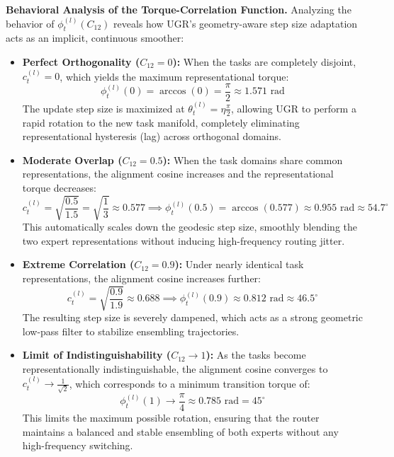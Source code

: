 \documentclass{article}
\theoremstyle{plain}
\theoremstyle{definition}
\theoremstyle{remark}
\begin{document}
\textbf{Behavioral Analysis of the Torque-Correlation Function.}
Analyzing the behavior of $\phi_t^{(l)}\left(C_{12}\right)$ reveals how UGR's geometry-aware step size adaptation acts as an implicit, continuous smoother:
\begin{itemize}
    \item \textbf{Perfect Orthogonality ($C_{12} = 0$):} 
    When the tasks are completely disjoint, $c_t^{(l)} = 0$, which yields the maximum representational torque:
    \begin{equation}
    \phi_t^{(l)}(0) = \arccos(0) = \frac{\pi}{2} \approx 1.571 \text{ rad}
    \end{equation}
    The update step size is maximized at $\theta_t^{(l)} = \eta \frac{\pi}{2}$, allowing UGR to perform a rapid rotation to the new task manifold, completely eliminating representational hysteresis (lag) across orthogonal domains.
    \item \textbf{Moderate Overlap ($C_{12} = 0.5$):}
    When the task domains share common representations, the alignment cosine increases and the representational torque decreases:
    \begin{equation}
    c_t^{(l)} = \sqrt{\frac{0.5}{1.5}} = \sqrt{\frac{1}{3}} \approx 0.577 \implies \phi_t^{(l)}(0.5) = \arccos\left(0.577\right) \approx 0.955 \text{ rad} \approx 54.7^\circ
    \end{equation}
    This automatically scales down the geodesic step size, smoothly blending the two expert representations without inducing high-frequency routing jitter.
    \item \textbf{Extreme Correlation ($C_{12} = 0.9$):}
    Under nearly identical task representations, the alignment cosine increases further:
    \begin{equation}
    c_t^{(l)} = \sqrt{\frac{0.9}{1.9}} \approx 0.688 \implies \phi_t^{(l)}(0.9) \approx 0.812 \text{ rad} \approx 46.5^\circ
    \end{equation}
    The resulting step size is severely dampened, which acts as a strong geometric low-pass filter to stabilize ensembling trajectories.
    \item \textbf{Limit of Indistinguishability ($C_{12} \to 1$):}
    As the tasks become representationally indistinguishable, the alignment cosine converges to $c_t^{(l)} \to \frac{1}{\sqrt{2}}$, which corresponds to a minimum transition torque of:
    \begin{equation}
    \phi_t^{(l)}(1) \to \frac{\pi}{4} \approx 0.785 \text{ rad} = 45^\circ
    \end{equation}
    This limits the maximum possible rotation, ensuring that the router maintains a balanced and stable ensembling of both experts without any high-frequency switching.
\end{itemize}
\end{document}
